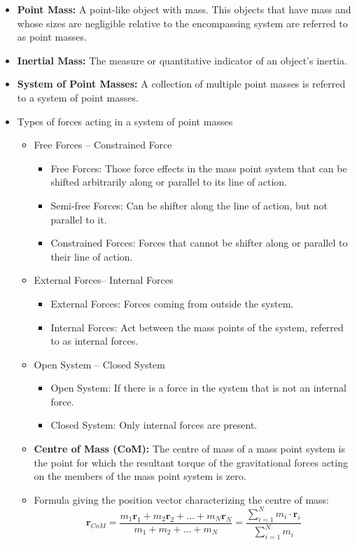 \documentclass[t,aspectratio=169]{beamer}
\begin{document}
\begin{frame}
\begin{itemize}
\frametitle{Rigid Bodies}
\item \textbf{Point Mass:} A point-like object with mass. This objects that have mass and whose sizes are negligible relative to the encompassing system are referred to as point masses.
\item \textbf{Inertial Mass:} The measure or quantitative indicator of an object’s inertia.
\item \textbf{System of Point Masses:} A collection of multiple point masses is referred to a system of point masses.
\item Types of forces acting in a system of point masses
  \begin{itemize}
  \item Free Forces – Constrained Force
    \begin{itemize}
    \item Free Forces: Those force effects in the mass point system that can be shifted arbitrarily along or parallel to its line of action.
    \item Semi-free Forces: Can be shifter along the line of action, but not parallel to it.
    \item Constrained Forces: Forces that cannot be shifter along or parallel to their line of action.
    \end{itemize}
\pagebreak
\item External Forces– Internal Forces
  \begin{itemize}
  \item External Forces: Forces coming from outside the system.
  \item Internal Forces: Act between the mass points of the system, referred to as internal forces.
  \end{itemize}
\item Open System – Closed System
  \begin{itemize}
  \item Open System: If there is a force in the system that is not an internal force.
  \item Closed System: Only internal forces are present.
  \end{itemize}
\item \textbf{Centre of Mass (CoM):} The centre of mass of a mass point system is the point for which the resultant torque of the gravitational forces acting on the members of the mass point system is zero.
\item Formula giving the position vector characterizing the centre of mass: $$ \mathbf{r}_{CoM}=\frac{m_{1}\mathbf{r}_{1}+m_{2}\mathbf{r}_{2}+\dots+m_{N}\mathbf{r}_{N}}{m_{1}+m_{2}+\dots+m_{N}}=\frac{\sum^{N}_{i=1}m_{i}\cdot\mathbf{r}_{i}}{\sum^{N}_{i=1}m_{i}}$$
\end{itemize}
    

\end{itemize}
\end{frame}
\end{document}
